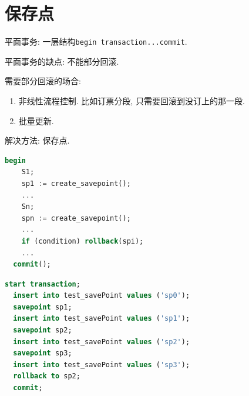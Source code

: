\section{保存点}

平面事务: 一层结构\verb|begin transaction...commit|.

平面事务的缺点: 不能部分回滚.

需要部分回滚的场合:
\begin{enumerate}
    \item 非线性流程控制. 比如订票分段, 只需要回滚到没订上的那一段.
    \item 批量更新.
\end{enumerate}

解决方法: 保存点.
\begin{lstlisting}[language=SQL]
  begin
    S1;
    sp1 := create_savepoint();
    ...
    Sn;
    spn := create_savepoint();
    ...
    if (condition) rollback(spi);
    ...
  commit();
\end{lstlisting}

\begin{lstlisting}[language=SQL]
  start transaction;
  insert into test_savePoint values ('sp0');
  savepoint sp1;
  insert into test_savePoint values ('sp1');
  savepoint sp2;
  insert into test_savePoint values ('sp2');
  savepoint sp3;
  insert into test_savePoint values ('sp3');
  rollback to sp2;
  commit;
\end{lstlisting}

\pagebreak

